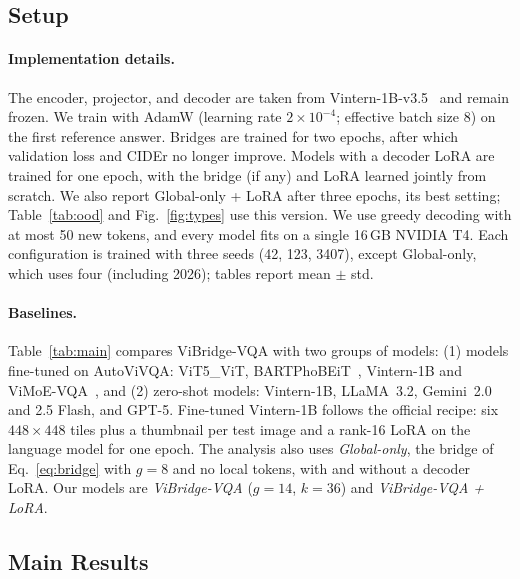 \subsection{Setup}

\paragraph{Implementation details.}
The encoder, projector, and decoder are taken from Vintern-1B-v3.5~\cite{doan2024vintern1b} and
remain frozen. We train with AdamW (learning rate $2\times10^{-4}$; effective batch size 8) on the
first reference answer. Bridges are trained for two epochs, after which validation loss and CIDEr
no longer improve. Models with a decoder LoRA are trained for one epoch, with the bridge (if any)
and LoRA learned jointly from scratch. We also report Global-only + LoRA after three epochs, its
best setting; Table~\ref{tab:ood} and Fig.~\ref{fig:types} use this version. We use greedy
decoding with at most 50 new tokens, and every model fits on a single 16\,GB NVIDIA T4. Each
configuration is trained with three seeds (42, 123, 3407), except Global-only, which uses four
(including 2026); tables report mean $\pm$ std.

\paragraph{Baselines.}
Table~\ref{tab:main} compares ViBridge-VQA with two groups of models: (1) models fine-tuned on
AutoViVQA:
ViT5\_ViT, BARTPhoBEiT~\cite{tran2023bartphobeitpretrainedsequencetosequenceimage}, Vintern-1B and
ViMoE-VQA~\cite{vimoevqa}, and (2) zero-shot models: Vintern-1B, LLaMA~3.2, Gemini~2.0 and 2.5
Flash, and GPT-5. Fine-tuned Vintern-1B follows the official recipe: six $448\times448$ tiles plus
a thumbnail per test image and a rank-16 LoRA on the language model for one epoch. The analysis also uses
\emph{Global-only}, the bridge of Eq.~\eqref{eq:bridge} with $g=8$ and no local tokens, with and
without a decoder LoRA. Our models are \emph{ViBridge-VQA} ($g=14$, $k=36$) and
\emph{ViBridge-VQA + LoRA}.

\subsection{Main Results}
\label{sec:main}

